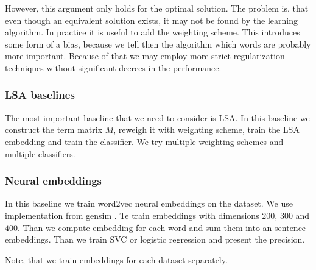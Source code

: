    However, this argument only holds for the optimal solution. 
    The problem is, that even though an equivalent solution exists, it may not be found by the learning algorithm. 
    In practice it is useful to add the weighting scheme. 
    This introduces some form of a bias, because we tell then the algorithm which words are probably more important.
    Because of that we may employ more strict regularization techniques without significant decrees in the performance.
    

    \* %
    
    
    \* %


    \subsubsection{LSA baselines}    
    The most important baseline that we need to consider is LSA.
    In this baseline we construct the term matrix $M$, reweigh it with weighting scheme, train the LSA embedding and train the classifier.
    We try multiple weighting schemes and multiple classifiers.
    
    \* %
    \* %

    \subsubsection{Neural embeddings}
    In this baseline we train word2vec neural embeddings on the dataset. 
    We use implementation from gensim .
    Te train embeddings with dimensions $200$, $300$ and $400$. 
    Than we compute embedding for each word and sum them into an sentence embeddings.
    Than we train SVC or logistic regression and present the precision.
    
    Note, that we train embeddings for each dataset separately.

